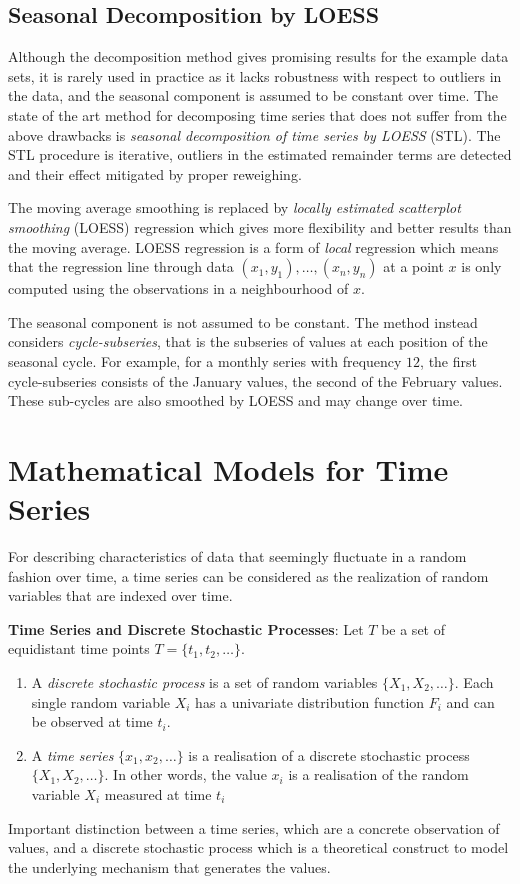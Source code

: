 \documentclass[11pt]{article}
\begin{document}
\subsection{Seasonal Decomposition by LOESS}
Although the decomposition method gives promising results for the example data sets, it is rarely used in practice as it lacks robustness with respect to outliers in the data, and the seasonal component is assumed to be constant over time. The state of the art method for decomposing time series that does not suffer from the above drawbacks is \emph{seasonal decomposition of time series by LOESS} (STL). The STL procedure is iterative, outliers in the estimated remainder terms are detected and their effect mitigated by proper reweighing.

The moving average smoothing is replaced by \emph{locally estimated scatterplot smoothing} (LOESS) regression which gives more flexibility and better results than the moving average. LOESS regression is a form of \emph{local} regression which means that the regression line through data $(x_1, y_1 ),\dots,(x_n, y_n)$ at a point $x$ is only computed using the observations in a neighbourhood of $x$.

The seasonal  component is not assumed to be constant. The method instead considers \emph{cycle-subseries}, that is the subseries of values at each position of the seasonal cycle. For example, for a monthly series with frequency $12$, the first cycle-subseries consists of the January values, the second of the February values. These sub-cycles are also smoothed by LOESS and may change over time.

\section{Mathematical Models for Time Series}
For describing characteristics of data that seemingly fluctuate in a random fashion over time, a time series can be considered as the realization of random variables that are indexed over time.

\begin{definition}
	\textbf{Time Series and Discrete Stochastic Processes}: Let $T$ be a set of equidistant time points $T =\{t_1, t_2, \dots\}$.
	\begin{enumerate}
		\item A \emph{discrete stochastic process} is a set of random variables $\{X_1, X_2, \dots\}$. Each single random variable $X_i$ has a univariate distribution function $F_i$ and can be observed at time $t_i$.
		\item A \emph{time series} $\{x_1, x_2, \dots\}$ is a realisation of a discrete stochastic process $\{X_1,X_2,\dots\}$. In other words, the value $x_i$ is a realisation of the random variable $X_i$ measured at time $t_i$
	\end{enumerate}
\end{definition}
Important distinction between a time series, which are a concrete observation of values, and a discrete stochastic process which is a theoretical construct to model the underlying mechanism that generates the values.
\end{document}
